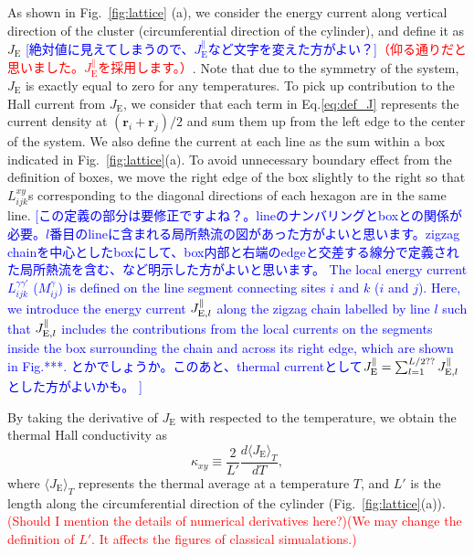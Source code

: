 \documentclass[reprint,amsmath,amssymb,aps,prx]{revtex4-2}
\newcommand{\red}[1]{\textcolor{red}{#1}}
\newcommand{\blue}[1]{\textcolor{blue}{#1}}
\begin{document}
 As shown in Fig.~\ref{fig:lattice} (a), we consider the energy current along vertical direction of the cluster (circumferential direction of the cylinder), and define it as $J_{\mathrm{E}}$ \blue{[絶対値に見えてしまうので、$J_{\mathrm{E}}^\parallel$など文字を変えた方がよい？]}\red{（仰る通りだと思いました。$J_{\mathrm{E}}^\parallel$を採用します。）}. Note that due to the symmetry of the system, $J_{\mathrm{E}}$ is exactly equal to zero for any temperatures. To pick up contribution to the Hall current from $J_{\mathrm{E}}$, we consider that each term in Eq.\eqref{eq:def_J} represents the current density at $(\bm{r}_i + \bm{r}_j)/2$ and sum them up from the left edge to the center of the system. We also define the current at each line as the sum within a box indicated in Fig.~\ref{fig:lattice}(a). To avoid unnecessary boundary effect from the definition of boxes, we move the right edge of the box slightly to the right so that $L^{xy}_{ijk}$s corresponding to the diagonal directions of each hexagon are in the same line.
\blue{[この定義の部分は要修正ですよね？。lineのナンバリングとboxとの関係が必要。$l$番目のlineに含まれる局所熱流の図があった方がよいと思います。zigzag chainを中心としたboxにして、box内部と右端のedgeと交差する線分で定義された局所熱流を含む、など明示した方がよいと思います。
The local energy current $L_{ijk}^{\gamma\gamma'}$ ($M_{ij}^{\gamma}$) is defined on the line segment connecting sites $i$ and $k$ ($i$ and $j$).
Here, we introduce the energy current $J_{{\rm E},l}^\parallel$ along the zigzag chain labelled by line $l$ such that $J_{{\rm E},l}^\parallel$ includes the contributions from the local currents on the segments inside the box surrounding the chain and across its right edge, which are shown in Fig.***. 
とかでしょうか。このあと、thermal currentとして$J_{\rm E}^\parallel=\sum_{l=1}^{L/2??}J_{{\rm E},l}^\parallel$とした方がよいかも。
]}

By taking the derivative of $J_{\mathrm{E}}$ with respected to the temperature, we obtain the thermal Hall conductivity as 
\begin{equation}
 \kappa_{xy} \equiv \frac{2}{L'} \frac{d \langle J_{\mathrm{E}}\rangle_{T}}{d T},
\label{eq:def_kxy}
\end{equation}
where $\langle J_{\mathrm{E}} \rangle_T$ represents the thermal average at a temperature $T$, and $L'$ is the length along the circumferential direction of the cylinder (Fig.~\ref{fig:lattice}(a)). \textcolor{red}{(Should I mention the details of numerical derivatives here?)}\textcolor{red}{(We may change the definition of $L'$. It affects the figures of classical simualations.)}
\end{document}
